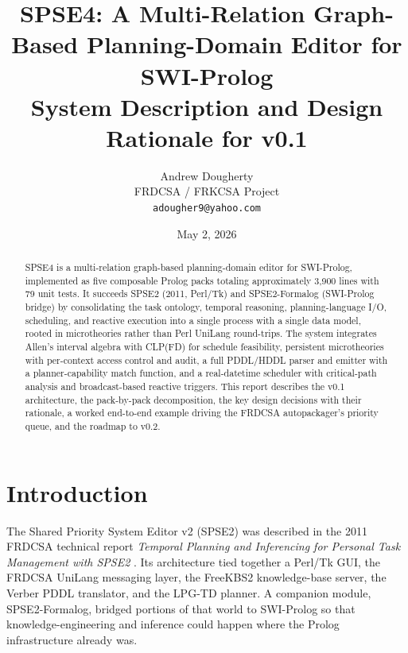 \documentclass[11pt,letterpaper]{article}
\title{\textbf{SPSE4: A Multi-Relation Graph-Based Planning-Domain Editor for SWI-Prolog}\\
       \large System Description and Design Rationale for v0.1}
\author{Andrew Dougherty\\
        \small FRDCSA / FRKCSA Project\\
        \small \texttt{adougher9@yahoo.com}}
\date{May 2, 2026}
\begin{document}
\maketitle
\thispagestyle{fancy}

\begin{abstract}
\noindent SPSE4 is a multi-relation graph-based planning-domain editor for
SWI-Prolog, implemented as five composable Prolog packs totaling
approximately 3,900 lines with 79 unit tests. It succeeds SPSE2 (2011,
Perl/Tk) and SPSE2-Formalog (SWI-Prolog bridge) by consolidating the task
ontology, temporal reasoning, planning-language I/O, scheduling, and
reactive execution into a single process with a single data model, rooted in
microtheories rather than Perl UniLang round-trips. The system integrates
Allen's interval algebra with CLP(FD) for schedule feasibility, persistent
microtheories with per-context access control and audit, a full PDDL/HDDL
parser and emitter with a planner-capability match function, and a
real-datetime scheduler with critical-path analysis and broadcast-based
reactive triggers. This report describes the v0.1 architecture, the
pack-by-pack decomposition, the key design decisions with their rationale,
a worked end-to-end example driving the FRDCSA autopackager's priority
queue, and the roadmap to v0.2.
\end{abstract}

\begin{center}
\end{center}
\vspace{0.5em}

\tableofcontents
\vspace{1em}

\section{Introduction}

The Shared Priority System Editor v2 (SPSE2) was described in the 2011
FRDCSA technical report \emph{Temporal Planning and Inferencing for
Personal Task Management with SPSE2} \citep{spse2-2011}. Its
architecture tied together a Perl/Tk GUI, the FRDCSA UniLang messaging
layer, the FreeKBS2 knowledge-base server, the Verber PDDL translator,
and the LPG-TD planner. A companion module, SPSE2-Formalog, bridged
portions of that world to SWI-Prolog so that knowledge-engineering and
inference could happen where the Prolog infrastructure already was.
\end{document}
